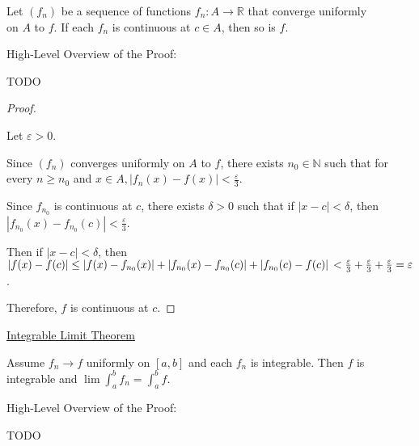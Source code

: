 \documentclass[12pt]{article}
\newcommand{\RR}{\mathbb{R}} %
\newcommand{\NN}{\mathbb{N}}
\newcommand\abs[1]{\left| #1 \right|} %
\newcommand{\eps}{\varepsilon}
\begin{document}
Let $(f_n)$ be a sequence of functions $f_n : A \rightarrow \RR$ that converge uniformly
\\
on $A$ to $f$. If each $f_n$ is continuous at $c \in A$, then so is $f$.

\dotfill

High-Level Overview of the Proof:

TODO

\dotfill

\begin{proof}
$ $

Let $\eps > 0$.

Since $(f_n)$ converges uniformly on $A$ to $f$, there exists $n_0 \in \NN$ such that for every $n \ge n_0$ and $x \in A, \abs{f_n(x) - f(x)} < \frac{\eps}{3}$.

Since $f_{n_0}$ is continuous at $c$, there exists $\delta > 0$ such that if $\abs{x - c} < \delta$, then $\abs{f_{n_0}(x) - f_{n_0}(c)} < \frac{\eps}{3}$.

Then if $\abs{x - c} < \delta$, then
\\
$\abs{f(x) - f(c)} \le \abs{f(x) - f_{n_0}(x)} + \abs{f_{n_0}(x) - f_{n_0}(c)} + \abs{f_{n_0}(c) - f(c)}
\\
< \frac{\eps}{3} + \frac{\eps}{3} + \frac{\eps}{3} = \eps$.

Therefore, $f$ is continuous at $c$.
\end{proof}

\pagebreak

\underline{Integrable Limit Theorem}

Assume $f_n \rightarrow f$ uniformly on $[a, b]$ and each $f_n$ is integrable. Then $f$ is integrable and $\lim \int_{a}^{b} f_n = \int_{a}^{b} f$.

\dotfill

High-Level Overview of the Proof:

TODO

\dotfill
\end{document}
